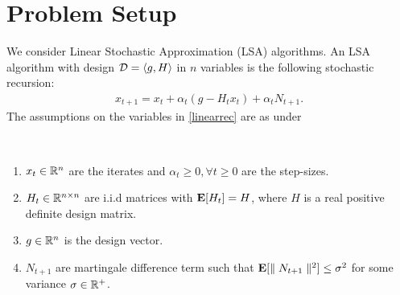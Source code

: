 \section{Problem Setup}
We consider Linear Stochastic Approximation (LSA) algorithms. An LSA algorithm with design $\mathcal{D}=\langle g,H\rangle$ in $n$ variables is the following stochastic recursion:
\begin{align}\label{linearrec}
x_{t+1}=x_t+\alpha_t(g-H_t x_t)+\alpha_t N_{t+1}.
\end{align}
The assumptions on the variables in \eqref{linearrec} are as under
\begin{assumption}\label{lsaassump}
\hspace{10pt}\\
\vspace{-20pt}
\begin{enumerate}[leftmargin=*]
\item $x_t\in \mathbb{R}^n$ are the iterates and $\alpha_t\geq 0 ,\forall t\geq 0$ are the step-sizes.
\item\label{pd} $H_t\in \mathbb{R}^{n\times n}$ are i.i.d matrices with $\mathbf{E}[H_t]=H$, where $H$ is a real positive definite design matrix.
\item $g\in \mathbb{R}^n$ is the design vector.
\item $N_{t+1}$ are martingale difference term such that $\mathbf{E}[\parallel N_{t+1} \parallel^2]\leq \sigma^2$ for some variance $\sigma\in \mathbb{R}^+$.
\end{enumerate}
\end{assumption}
